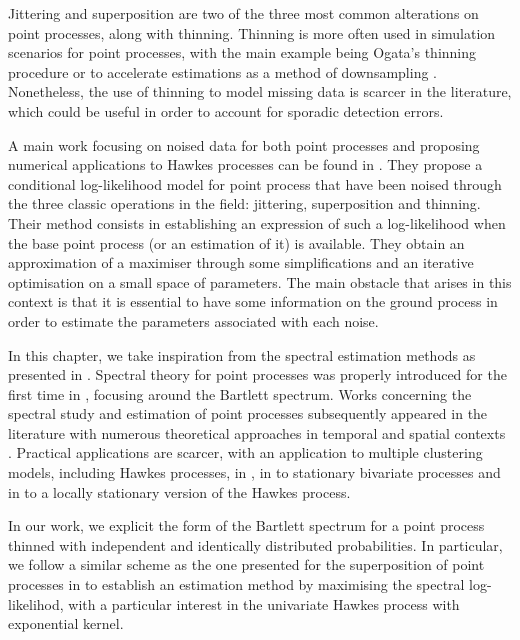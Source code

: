 Jittering and superposition are two of the three most common alterations on point processes, along with thinning.
Thinning is more often used in simulation scenarios for point processes, 
with the main example being Ogata's thinning procedure \parencite{Ogata1981} or to accelerate estimations as a method of downsampling \parencite{Li2019}.
Nonetheless, the use of thinning to model missing data is scarcer in the literature, 
which could be useful in order to account for sporadic detection errors.

A main work focusing on noised data for both point processes and proposing numerical applications to Hawkes processes can be found in \textcite{Lund2000}. 
They propose a conditional log-likelihood model for point process that have been noised through the three classic operations in the field: jittering, superposition and thinning. 
Their method consists in establishing an expression of such a log-likelihood when the base point process (or an estimation of it) is available.
They obtain an approximation of a maximiser through some simplifications and an iterative optimisation on a small space of parameters.
The main obstacle that arises in this context is that it is essential to have some information on the ground process in order to estimate the parameters associated with each noise.

In this chapter, we take inspiration from the spectral estimation methods as presented in \textcite{Cheysson2022, Bonnet2024}.
Spectral theory for point processes was properly introduced for the first time in \textcite{Bartlett1963},
focusing around the Bartlett spectrum. 
Works concerning the spectral study and estimation of point processes subsequently appeared in the literature with numerous theoretical approaches in temporal and spatial contexts \parencite{Daley1971, Tuan1981, Mugglestone2001, Rajala2023}. Practical applications are scarcer, with an application to multiple clustering models, including Hawkes processes, in \textcite{Adamopoulos1976}, in \textcite{Karavasilis2007} to stationary bivariate processes and in \textcite{Roueff2019} to a locally stationary version of the Hawkes process.


In our work, we explicit the form of the Bartlett spectrum for a point process thinned with independent and identically distributed probabilities. In particular, we follow a similar scheme as the one presented for the superposition of point processes in \textcite{Bonnet2024} to establish an estimation method by maximising the spectral log-likelihod, with a particular interest in the univariate Hawkes process with exponential kernel.

